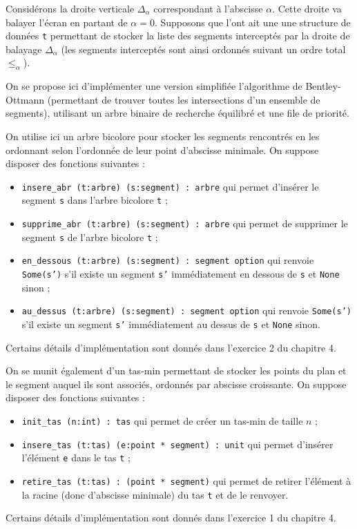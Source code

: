 \Q
Considérons la droite verticale $\Delta_\alpha$ correspondant à l'abscisse $\alpha$. Cette droite va balayer l'écran en partant de $\alpha=0$. Supposons que l'ont ait une une structure de données \texttt{t} permettant de stocker la liste des segments interceptés par la droite de balayage $\Delta_\alpha$ (les segments interceptés sont ainsi ordonnés suivant un ordre total $\leq_\alpha$).
\medskip

On se propose ici d'implémenter une version simplifiée l'algorithme de Bentley-Ottmann (permettant de trouver toutes les intersections d'un ensemble de segments), utilisant un arbre binaire de recherche équilibré et une file de priorité.
\medskip

On utilise ici un arbre bicolore pour stocker les segments rencontrés en les ordonnant selon l'ordonnée de leur point d'abscisse minimale. On suppose disposer des fonctions suivantes :
\begin{itemize}
    \item \texttt{insere\_abr (t:arbre) (s:segment) : arbre} qui permet d'insérer le segment \texttt{s} dans l'arbre bicolore \texttt{t} ;
    \item \texttt{supprime\_abr (t:arbre) (s:segment) : arbre} qui permet de supprimer le segment \texttt{s} de l'arbre bicolore \texttt{t} ;
    \item \texttt{en\_dessous (t:arbre) (s:segment) : segment option} qui renvoie \texttt{Some(s')} s'il existe un segment \texttt{s'} immédiatement en dessous de \texttt{s} et \texttt{None} sinon ;
    \item \texttt{au\_dessus (t:arbre) (s:segment) : segment option} qui renvoie \texttt{Some(s')} s'il existe un segment \texttt{s'} immédiatement au dessus de \texttt{s} et \texttt{None} sinon.
\end{itemize}
Certains détails d'implémentation sont donnés dans l'exercice 2 du chapitre 4.
\medskip

On se munit également d'un tas-min permettant de stocker les points du plan et le segment auquel ils sont associés, ordonnés par abscisse croissante. On suppose disposer des fonctions suivantes :
\begin{itemize}
    \item \texttt{init\_tas (n:int) : tas} qui permet de créer un tas-min de taille $n$ ;
    \item \texttt{insere\_tas (t:tas) (e:point * segment) : unit} qui permet d'insérer l'élément \texttt{e} dans le tas \texttt{t} ;
    \item \texttt{retire\_tas (t:tas) : (point * segment)} qui permet de retirer l'élément à la racine (donc d'abscisse minimale) du tas \texttt{t} et de le renvoyer.
\end{itemize}
Certains détails d'implémentation sont donnés dans l'exercice 1 du chapitre 4.
\bigskip

